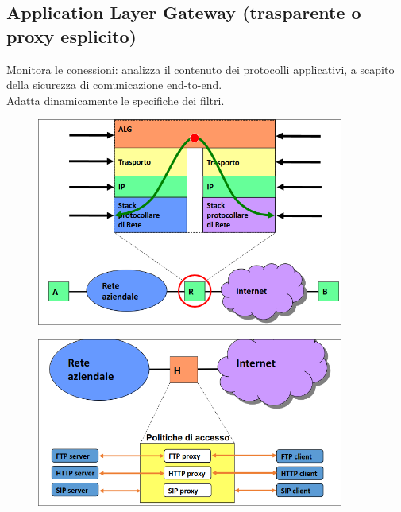 \documentclass{report}
\begin{document}
            \subsection{Application Layer Gateway (trasparente o proxy esplicito)}
                Monitora le conessioni: analizza il contenuto dei protocolli applicativi, a scapito della sicurezza di comunicazione end-to-end.
                \\
                Adatta dinamicamente le specifiche dei filtri.
                \begin{figure}[H]
                    \includegraphics[width=0.9\textwidth]{2/apL.png}
                \end{figure}
                \begin{figure}[H]
                    \includegraphics[width=0.9\textwidth]{2/apL2.png}
                \end{figure}
\end{document}
